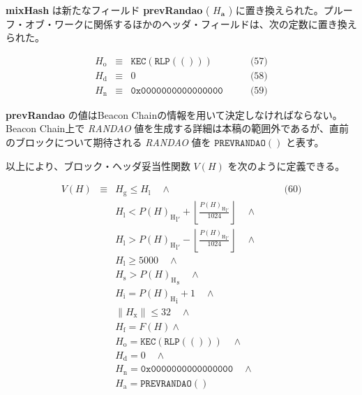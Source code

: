 \documentclass[
]{ltjsarticle}
\begin{document}
\textbf{mixHash} は新たなフィールド \textbf{prevRandao} (
\(H_{\mathbf{a}}\) )
に置き換えられた。プルーフ・オブ・ワークに関係するほかのヘッダ・フィールドは、次の定数に置き換えられた。

\protect\hypertarget{eq-57}{}{}\protect\hypertarget{eq-58}{}{}\protect\hypertarget{eq-59}{}{}

\[\begin{aligned}
H_{\mathrm{o}} & \equiv & \texttt{KEC}(\texttt{RLP}(())) & \qquad \text{(57)} \\
H_{\mathrm{d}} & \equiv  & 0 & \qquad \text{(58)} \\
H_{\mathrm{n}}  & \equiv & \texttt{0x0000000000000000} & \qquad \text{(59)}
\end{aligned}\]

\textbf{prevRandao} の値はBeacon
Chainの情報を用いて決定しなければならない。Beacon Chain上で
\emph{RANDAO}
値を生成する詳細は本稿の範囲外であるが、直前のブロックについて期待される
\emph{RANDAO} 値を \(\mathtt{PREVRANDAO}()\) と表す。

\hypertarget{block_header_validity_function}{}

以上により、ブロック・ヘッダ妥当性関数 \(V(H)\) を次のように定義できる。

\protect\hypertarget{eq-60}{}{}

\[\begin{aligned}
V(H) & \equiv & H_{\mathrm{g}} \le H_{\mathrm{l}}  \quad \wedge & \qquad \text{(60)} \\
& & H_{\mathrm{l}} < {P(H)_{\mathrm{H}}}_{\mathrm{l}'} + \left\lfloor\frac{{P(H)_{\mathrm{H}}}_{\mathrm{l}'}}{1024}\right\rfloor  \quad \wedge \\
& & H_{\mathrm{l}} > {P(H)_{\mathrm{H}}}_{\mathrm{l}'} - \left\lfloor\frac{{P(H)_{\mathrm{H}}}_{\mathrm{l}'}}{1024}\right\rfloor  \quad \wedge \\
& & H_{\mathrm{l}} \geqslant 5000  \quad \wedge \\
& & H_{\mathrm{s}} > {P(H)_{\mathrm{H}}}_{\mathrm{s}} \quad \wedge \\
& & H_{\mathrm{i}} = {P(H)_{\mathrm{H}}}_{\mathrm{i}} +1 \quad \wedge \\
& & \lVert H_{\mathrm{x}} \rVert \le 32 \quad \wedge \\
& & H_{\mathrm{f}} = F(H) \wedge \\
& & H_{\mathrm{o}} = \texttt{KEC}(\texttt{RLP}(())) \quad \wedge \\
& & H_{\mathrm{d}} = 0 \quad \wedge \\
& & H_{\mathrm{n}} = \texttt{0x0000000000000000} \quad \wedge \\
& & H_{\mathrm{a}} = \mathtt{PREVRANDAO}()
\end{aligned}\]
\end{document}

